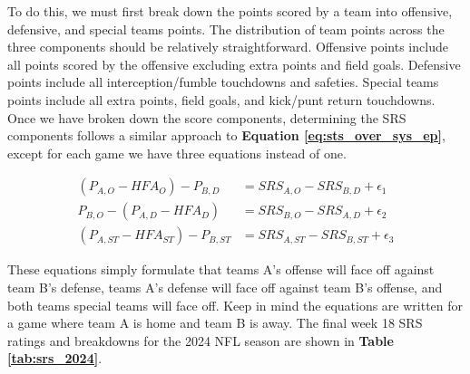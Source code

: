 \documentclass{report}
\begin{document}
To do this, we must first break down the points scored by a team into offensive, defensive, and special teams points.
The distribution of team points across the three components should be relatively straightforward.
Offensive points include all points scored by the offensive excluding extra points and field goals.
Defensive points include all interception/fumble touchdowns and safeties.
Special teams points include all extra points, field goals, and kick/punt return touchdowns.
Once we have broken down the score components, determining the SRS components follows a similar approach to \textbf{Equation \ref{eq:sts_over_sys_ep}}, except for each game we have three equations instead of one.

\begin{align}
    (P_{A,O} - HFA_O) - P_{B,D} &= SRS_{A,O} - SRS_{B,D} + \epsilon_1 \label{eq:off_def_1} \\
    P_{B,O} - (P_{A,D} - HFA_D) &= SRS_{B,O} - SRS_{A,D} + \epsilon_2 \label{eq:off_def_2} \\
    (P_{A,ST} - HFA_{ST}) - P_{B, ST} &= SRS_{A,ST} - SRS_{B,ST} + \epsilon_3
\end{align}

These equations simply formulate that teams A's offense will face off against team B's defense, teams A's defense will face off against team B's offense, and both teams special teams will face off.
Keep in mind the equations are written for a game where team A is home and team B is away.
The final week 18 SRS ratings and breakdowns for the 2024 NFL season are shown in \textbf{Table \ref{tab:srs_2024}}.
\end{document}
